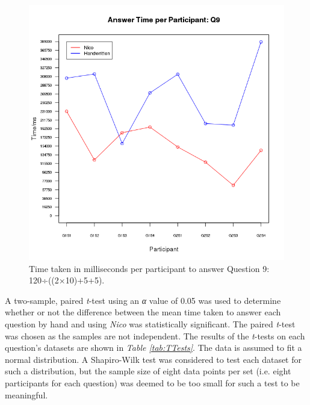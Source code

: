 \documentclass[12pt,twoside,notitlepage,xetex]{report}
\begin{document}
\begin{center}
\begin{figure}[H]
\begin{center}
\includegraphics[width=\textwidth-2cm]{figs/graphs/q9.png}
\end{center}
\caption{Time taken in milliseconds per participant to answer Question 9: 120÷((2×10)+5+5).}
\label{fig:PlotQ9}
\end{figure}
\end{center}

A two-sample, paired \emph{t}-test using an \emph{α} value of 0.05 was used to determine whether or not the difference between the mean time taken to answer each question by hand and using \emph{Nico} was statistically significant.  The paired \emph{t}-test was chosen as the samples are not independent.  The results of the \emph{t}-tests on each question's datasets are shown in \emph{Table \ref{tab:TTests}}.  The data is assumed to fit a normal distribution.  A Shapiro-Wilk test was considered to test each dataset for such a distribution, but the sample size of eight data points per set (i.e. eight participants for each question) was deemed to be too small for such a test to be meaningful.
\end{document}
